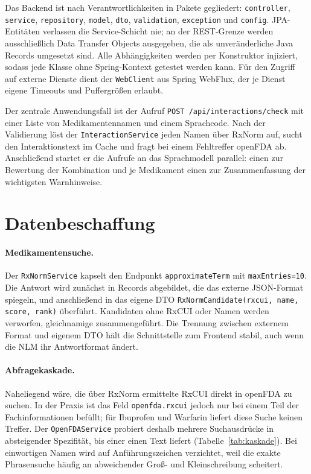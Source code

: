 Das Backend ist nach Verantwortlichkeiten in Pakete gegliedert: \texttt{controller}, \texttt{service}, \texttt{repository}, \texttt{model}, \texttt{dto}, \texttt{validation}, \texttt{exception} und \texttt{config}. JPA-Entitäten verlassen die Service-Schicht nie; an der REST-Grenze werden ausschließlich Data Transfer Objects ausgegeben, die als unveränderliche Java Records umgesetzt sind. Alle Abhängigkeiten werden per Konstruktor injiziert, sodass jede Klasse ohne Spring-Kontext getestet werden kann. Für den Zugriff auf externe Dienste dient der \texttt{WebClient} aus Spring WebFlux, der je Dienst eigene Timeouts und Puffergrößen erlaubt.

Der zentrale Anwendungsfall ist der Aufruf \texttt{POST /api/interactions/check} mit einer Liste von Medikamentennamen und einem Sprachcode. Nach der Validierung löst der \texttt{InteractionService} jeden Namen über RxNorm auf, sucht den Interaktionstext im Cache und fragt bei einem Fehltreffer openFDA ab. Anschließend startet er die Aufrufe an das Sprachmodell parallel: einen zur Bewertung der Kombination und je Medikament einen zur Zusammenfassung der wichtigsten Warnhinweise.

\section{Datenbeschaffung}

\paragraph{Medikamentensuche.} Der \texttt{RxNormService} kapselt den Endpunkt \texttt{approximateTerm} mit \texttt{maxEntries=10}. Die Antwort wird zunächst in Records abgebildet, die das externe JSON-Format spiegeln, und anschließend in das eigene DTO \texttt{RxNormCandidate(rxcui, name, score, rank)} überführt. Kandidaten ohne RxCUI oder Namen werden verworfen, gleichnamige zusammengeführt. Die Trennung zwischen externem Format und eigenem DTO hält die Schnittstelle zum Frontend stabil, auch wenn die NLM ihr Antwortformat ändert.

\paragraph{Abfragekaskade.} Naheliegend wäre, die über RxNorm ermittelte RxCUI direkt in openFDA zu suchen. In der Praxis ist das Feld \texttt{openfda.rxcui} jedoch nur bei einem Teil der Fachinformationen befüllt; für Ibuprofen und Warfarin liefert diese Suche keinen Treffer. Der \texttt{OpenFDAService} probiert deshalb mehrere Suchausdrücke in absteigender Spezifität, bis einer einen Text liefert (Tabelle~\ref{tab:kaskade}). Bei einwortigen Namen wird auf Anführungszeichen verzichtet, weil die exakte Phrasensuche häufig an abweichender Groß- und Kleinschreibung scheitert.

